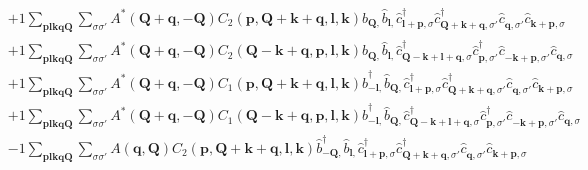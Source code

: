 \begin{align*}
	&+1 \sum_{ \mathbf{p} \mathbf{l} \mathbf{k} \mathbf{q} \mathbf{Q} } \sum_{ \sigma \sigma' } A^*( \mathbf{Q}+\mathbf{q}, -\mathbf{Q} )  C_2( \mathbf{p}, \mathbf{Q}+\mathbf{k}+\mathbf{q}, \mathbf{l}, \mathbf{k} )   \hat{b}_{ \mathbf{Q}, }^{\phantom{\dagger}} \hat{b}_{ \mathbf{l}, }^{\phantom{\dagger}} \hat{c}_{ \mathbf{l}+\mathbf{p}, \sigma }^\dagger  \hat{c}_{ \mathbf{Q}+\mathbf{k}+\mathbf{q}, \sigma' }^\dagger  \hat{c}_{ \mathbf{q}, \sigma' }^{\phantom{\dagger}} \hat{c}_{ \mathbf{k}+\mathbf{p}, \sigma }^{\phantom{\dagger}}  \\
	&+1 \sum_{ \mathbf{p} \mathbf{l} \mathbf{k} \mathbf{q} \mathbf{Q} } \sum_{ \sigma \sigma' } A^*( \mathbf{Q}+\mathbf{q}, -\mathbf{Q} )  C_2( \mathbf{Q}-\mathbf{k}+\mathbf{q}, \mathbf{p}, \mathbf{l}, \mathbf{k} )   \hat{b}_{ \mathbf{Q}, }^{\phantom{\dagger}} \hat{b}_{ \mathbf{l}, }^{\phantom{\dagger}} \hat{c}_{ \mathbf{Q}-\mathbf{k}+\mathbf{l}+\mathbf{q}, \sigma }^\dagger  \hat{c}_{ \mathbf{p}, \sigma' }^\dagger  \hat{c}_{ -\mathbf{k}+\mathbf{p}, \sigma' }^{\phantom{\dagger}} \hat{c}_{ \mathbf{q}, \sigma }^{\phantom{\dagger}}  \\
	&+1 \sum_{ \mathbf{p} \mathbf{l} \mathbf{k} \mathbf{q} \mathbf{Q} } \sum_{ \sigma \sigma' } A^*( \mathbf{Q}+\mathbf{q}, -\mathbf{Q} )  C_1( \mathbf{p}, \mathbf{Q}+\mathbf{k}+\mathbf{q}, \mathbf{l}, \mathbf{k} )   \hat{b}_{ -\mathbf{l}, }^\dagger  \hat{b}_{ \mathbf{Q}, }^{\phantom{\dagger}} \hat{c}_{ \mathbf{l}+\mathbf{p}, \sigma }^\dagger  \hat{c}_{ \mathbf{Q}+\mathbf{k}+\mathbf{q}, \sigma' }^\dagger  \hat{c}_{ \mathbf{q}, \sigma' }^{\phantom{\dagger}} \hat{c}_{ \mathbf{k}+\mathbf{p}, \sigma }^{\phantom{\dagger}}  \\
	&+1 \sum_{ \mathbf{p} \mathbf{l} \mathbf{k} \mathbf{q} \mathbf{Q} } \sum_{ \sigma \sigma' } A^*( \mathbf{Q}+\mathbf{q}, -\mathbf{Q} )  C_1( \mathbf{Q}-\mathbf{k}+\mathbf{q}, \mathbf{p}, \mathbf{l}, \mathbf{k} )   \hat{b}_{ -\mathbf{l}, }^\dagger  \hat{b}_{ \mathbf{Q}, }^{\phantom{\dagger}} \hat{c}_{ \mathbf{Q}-\mathbf{k}+\mathbf{l}+\mathbf{q}, \sigma }^\dagger  \hat{c}_{ \mathbf{p}, \sigma' }^\dagger  \hat{c}_{ -\mathbf{k}+\mathbf{p}, \sigma' }^{\phantom{\dagger}} \hat{c}_{ \mathbf{q}, \sigma }^{\phantom{\dagger}}  \\
	&-1 \sum_{ \mathbf{p} \mathbf{l} \mathbf{k} \mathbf{q} \mathbf{Q} } \sum_{ \sigma \sigma' } A( \mathbf{q}, \mathbf{Q} )  C_2( \mathbf{p}, \mathbf{Q}+\mathbf{k}+\mathbf{q}, \mathbf{l}, \mathbf{k} )   \hat{b}_{ -\mathbf{Q}, }^\dagger  \hat{b}_{ \mathbf{l}, }^{\phantom{\dagger}} \hat{c}_{ \mathbf{l}+\mathbf{p}, \sigma }^\dagger  \hat{c}_{ \mathbf{Q}+\mathbf{k}+\mathbf{q}, \sigma' }^\dagger  \hat{c}_{ \mathbf{q}, \sigma' }^{\phantom{\dagger}} \hat{c}_{ \mathbf{k}+\mathbf{p}, \sigma }^{\phantom{\dagger}}  \\

\end{align*}
